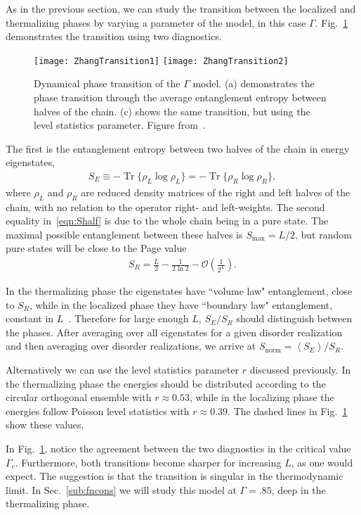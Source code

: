 \documentclass[a4paper,11pt]{article}
\renewcommand{\th}[1]{\frac{1}{#1}}
\newcommand{\ex}[1]{\left\langle #1 \right\rangle}
\DeclareMathOperator{\Tr}{Tr}
\begin{document}
As in the previous section, we can study the transition between the localized and thermalizing phases by varying a parameter of the model, in this case $\Gamma$. Fig.~\ref{fig:floqtrans} demonstrates the transition using two diagnostics. 
\begin{figure}
	\centering
	\texttt{[image: ZhangTransition1]}
	\texttt{[image: ZhangTransition2]}
	\caption{Dynamical phase transition of the $\Gamma$ model. (a) demonstrates the phase transition through the average entanglement entropy between halves of the chain. (c) shows the same transition, but using the level statistics parameter. Figure from~\cite{ZhangFloq}.}
	\label{fig:floqtrans}
\end{figure}
The first is the entanglement entropy between two halves of the chain in energy eigenstates, 
\begin{align}
S_E \equiv -\Tr\{\rho_L\log\rho_L\} = -\Tr\{\rho_R\log\rho_R\},\label{eqn:Shalf}
\end{align}
where $\rho_L$ and $\rho_R$ are reduced density matrices of the right and left halves of the chain, with no relation to the operator right- and left-weights. The second equality in~\ref{eqn:Shalf} is due to the whole chain being in a pure state. The maximal possible entanglement between these halves is $S_\text{max}=L/2$, but random pure states will be close to the Page value~\cite{Page, ZhangTherm}
\begin{align}
S_R = \frac{L}{2} - \th{2\ln 2} -\mathcal{O}\left(\th{2^L}\right).
\end{align}

In the thermalizing phase the eigenstates have ``volume law" entanglement, close to $S_R$, while in the localized phase they have ``boundary law" entanglement, constant in $L$~\cite{ZhangFloq}. Therefore for large enough $L$, $S_E/S_R$ should distinguish between the phases. After averaging over all eigenstates for a given disorder realization and then averaging over disorder realizations, we arrive at $S_\text{norm} = \ex{S_E}/S_R$.

Alternatively we can use the level statistics parameter $r$ discussed previously. In the thermalizing phase the energies should be distributed according to the circular orthogonal ensemble with $r \approx 0.53$, while in the localizing phase the energies follow Poisson level statistics with $r\approx 0.39$. The dashed lines in Fig.~\ref{fig:floqtrans} show these values.

In Fig.~\ref{fig:floqtrans}, notice the agreement between the two diagnostics in the critical value $\Gamma_c$. Furthermore, both transitions become sharper for increasing $L$, as one would expect. The suggestion is that the transition is singular in the thermodynamic limit. In Sec.~\ref{sub:fncons} we will study this model at $\Gamma=.85$, deep in the thermalizing phase.
\end{document}
